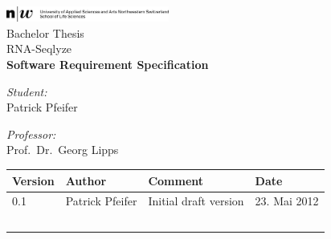 \begin{titlepage}
\begin{center}
%
\includegraphics[width=0.4\textwidth]{../../assets/fhnw_hls_e_10mm}
\\[1cm]
{ \large Bachelor Thesis }
%
\\[1cm]
{ \sffamily\Huge RNA-Seqlyze }
\\[1cm]
{ \sffamily\LARGE \bfseries Software Requirement Specification }
\\[2cm]
%
\begin{minipage}{0.4\textwidth}
\begin{flushleft}
\large\emph{Student:}\\
	Patrick Pfeifer\\
\end{flushleft}
\end{minipage}
\begin{minipage}{0.4\textwidth}
\begin{flushright}
\large\emph{Professor:}\\
	Prof.~Dr.~Georg Lipps
\end{flushright}
\end{minipage}
%
\vfill
%
\listoftodos\vfill
%
\setlength{\aboverulesep}{0pt}
\setlength{\belowrulesep}{0pt}
\setlength{\extrarowheight}{.75ex}
\begin{tabularx}{\textwidth}{|p{1.2cm}|>{\raggedright}X|X|p{3cm}|}
\rowcolor[gray]{0.8}
	Version & Author & Comment & Date\\
\midrule
	  0.1
	& Patrick Pfeifer
	& Initial draft version
	& 23. Mai 2012
\\
	  \ 
	& \ 
	& \ 
	& \ 
\\
\bottomrule
\end{tabularx}
\end{center}
\end{titlepage}
